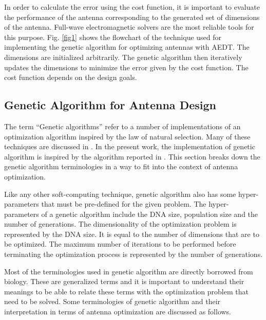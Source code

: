 In order to calculate the error using the cost function, it is important to evaluate the performance of the antenna corresponding to the generated set of dimensions of the antenna. Full-wave electromagnetic solvers are the most reliable tools for this purpose. Fig. \ref{fig1} shows the flowchart of the technique used for implementing the genetic algorithm for optimizing antennas with AEDT. The dimensions are initialized arbitrarily. The genetic algorithm then iteratively updates the dimensions to minimize the error given by the cost function. The cost function depends on the design goals.

\subsection{Genetic Algorithm for Antenna Design}
The term ``Genetic algorithms'' refer to a number of implementations of an optimization algorithm inspired by the law of natural selection. Many of these techniques are discussed in \cite{gaBook}. In the present work, the implementation of genetic algorithm is inspired by the algorithm reported in \cite{gaImpl}. This section breaks down the genetic algorithm terminologies in a way to fit into the context of antenna optimization.

Like any other soft-computing technique, genetic algorithm also has some hyper-parameters that must be pre-defined for the given problem. The hyper-parameters of a genetic algorithm include the DNA size, population size and the number of generations. The dimensionality of the optimization problem is represented by the DNA size. It is equal to the number of dimensions that are to be optimized. The maximum number of iterations to be performed before terminating the optimization process is represented by the number of generations.

Most of the terminologies used in genetic algorithm are directly borrowed from biology. These are generalized terms and it is important to understand their meanings to be able to relate these terms with the optimization problem that need to be solved. Some terminologies of genetic algorithm and their interpretation in terms of antenna optimization are discussed as follows.

